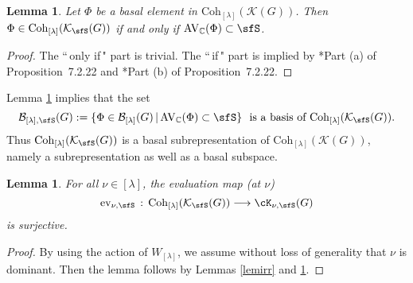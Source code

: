 \documentclass[12pt,a4paper]{amsart}
\newcommand{\AV}{\mathrm{AV}}
\newcommand{\CK}{{\mathcal {K}}}
\newcommand{\be}{\begin {equation}}
\newcommand{\ee}{\end {equation}}
\numberwithin{equation}{section}
\newtheorem{lem}[thm]{Lemma}
\theoremstyle{remark}
\def\Coh{\mathrm{Coh}}
\newcommand{\Lam}{{[\lambda]}}
\newcommand{\Grt}{\cK}
\begin{document}
\begin{lem}\label{lemirr11}
Let $\Phi$ be a basal element in $\Coh_{[\lambda]}(\CK(G))$. Then  $\Phi \in \Coh_{[\lambda]}(\CK_\sfS(G))$ if and only if $\AV_\C(\Phi)\subset \sfS$.
         \end{lem}
\begin{proof}
The ``$\,$only if$\,$" part is trivial. The ``$\,$if$\,$" part is implied by \cite{Vg}*{Part (a) of Proposition~7.2.22} and
\cite{Vg}*{Part (b) of Proposition~7.2.22}.
\end{proof}

Lemma \ref{lemirr11} implies that the set
\be\label{basiss}
   \mathcal B_{\Lam,\sfS}(G):=\{\Phi\in \mathcal B_\Lam(G)\,|\,\AV_\C(\Phi)\subset \sfS\}
  \  \textrm{
    is a basis of $ \Coh_{[\lambda]}(\CK_\sfS(G))$.}
    \ee
     Thus $ \Coh_{[\lambda]}(\CK_\sfS(G))$ is a basal subrepresentation of $ \Coh_{[\lambda]}(\CK(G))$, namely a subrepresentation as well as a basal subspace.

\begin{lem}\label{sur111}
For all $\nu\in\Lam$, the evaluation map  (at $\nu$)
  \[
    \mathrm{ev}_{\nu , \sfS} \, :\, \Coh_{[\lambda]}(\CK_\sfS(G)) \longrightarrow \Grt_{\nu, \sfS}(G)
  \]
 is surjective.
\end{lem}
\begin{proof}
By using the action of $W_\Lam$, we assume without loss of generality that $\nu$ is dominant. Then the lemma follows by Lemmas \ref{lemirr} and \ref{lemirr11}.
\end{proof}
\end{document}
